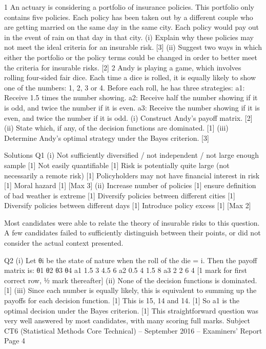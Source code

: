 \documentclass[a4paper,12pt]{article}
\begin{document}
1 An actuary is considering a portfolio of insurance policies. This portfolio only contains five policies. Each policy has been taken out by a different couple who are getting married on the same day in the same city. Each policy would pay out in the
event of rain on that day in that city.
(i) Explain why these policies may not meet the ideal criteria for an insurable risk. [3]
(ii) Suggest two ways in which either the portfolio or the policy terms could be changed in order to better meet the criteria for insurable risks. [2]
2 Andy is playing a game, which involves rolling four-sided fair dice. Each time a dice is rolled, it is equally likely to show one of the numbers: 1, 2, 3 or 4.
Before each roll, he has three strategies:
  a1: Receive 1.5 times the number showing.
a2: Receive half the number showing if it is odd, and twice the number if it is even.
a3: Receive the number showing if it is even, and twice the number if it is odd.
(i) Construct Andy’s payoff matrix. [2]
(ii) State which, if any, of the decision functions are dominated. [1]
(iii) Determine Andy’s optimal strategy under the Bayes criterion. [3]

\newpage
Solutions
Q1 (i) Not sufficiently diversified / not independent / not large enough sample [1]
Not easily quantifiable [1]
Risk is potentially quite large (not necessarily a remote risk) [1]
Policyholders may not have financial interest in risk [1]
Moral hazard [1]
[Max 3]
(ii) Increase number of policies [1]
ensure definition of bad weather is extreme [1]
Diversify policies between different cities [1]
Diversify policies between different days [1]
Introduce policy excess [1]
[Max 2]

Most candidates were able to relate the theory of insurable risks to this question. A few candidates failed to sufficiently distinguish between their points, or did not consider the actual context presented.

Q2 (i) Let θi be the state of nature when the roll of the die = i.
Then the payoff matrix is:
  θ1 θ2 θ3 θ4
a1 1.5 3 4.5 6
a2 0.5 4 1.5 8
a3 2 2 6 4
[1 mark for first correct row, ½ mark thereafter]
(ii) None of the decision functions is dominated. [1]
(iii) Since each number is equally likely, this is equivalent to summing up the payoffs for each decision function. [1]
This is 15, 14 and 14. [1]
So a1 is the optimal decision under the Bayes criterion. [1]
This straightforward question was very well answered by most candidates, with many scoring full marks.
Subject CT6 (Statistical Methods Core Technical) – September 2016 – Examiners’ Report
Page 4
\end{document}
